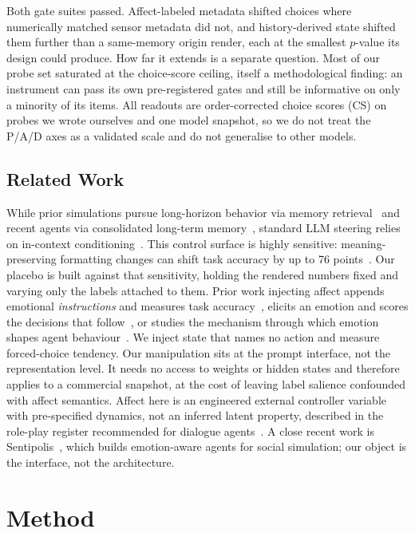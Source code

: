 \documentclass[sigconf]{acmart}
\begin{document}
Both gate suites passed. Affect-labeled metadata shifted choices where numerically matched sensor metadata did not, and history-derived state shifted them further than a same-memory origin render, each at the smallest $p$-value its design could produce. How far it extends is a separate question. Most of our probe set saturated at the choice-score ceiling, itself a methodological finding: an instrument can pass its own pre-registered gates and still be informative on only a minority of its items. All readouts are order-corrected choice scores (CS) on probes we wrote ourselves and one model snapshot, so we do not treat the P/A/D axes as a validated scale and do not generalise to other models.

\subsection{Related Work}
While prior simulations pursue long-horizon behavior via memory retrieval~\cite{park2023generative} and recent agents via consolidated long-term memory~\cite{zhong2024memorybank}, standard LLM steering relies on in-context conditioning~\cite{brown2020language}. This control surface is highly sensitive: meaning-preserving formatting changes can shift task accuracy by up to 76 points~\cite{sclar2024quantifying}. Our placebo is built against that sensitivity, holding the rendered numbers fixed and varying only the labels attached to them. Prior work injecting affect appends emotional \emph{instructions} and measures task accuracy~\cite{li2023emotional}, elicits an emotion and scores the decisions that follow~\cite{mozikov2024eai,ho2026induced}, or studies the mechanism through which emotion shapes agent behaviour~\cite{sun2026emotion}. We inject state that names no action and measure forced-choice tendency. Our manipulation sits at the prompt interface, not the representation level. It needs no access to weights or hidden states and therefore applies to a commercial snapshot, at the cost of leaving label salience confounded with affect semantics. Affect here is an engineered external controller variable with pre-specified dynamics, not an inferred latent property, described in the role-play register recommended for dialogue agents~\cite{shanahan2023roleplay,shanahan2024talking}. A close recent work is Sentipolis~\cite{fu2026sentipolis}, which builds emotion-aware agents for social simulation; our object is the interface, not the architecture.

\section{Method}
\end{document}
